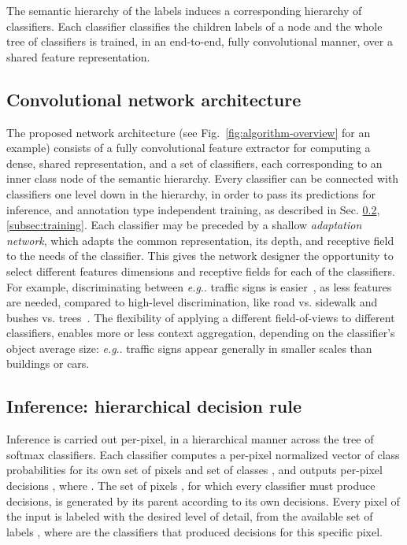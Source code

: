 \documentclass[letterpaper, 10 pt, conference]{ieeeconf}
\makeatletter
\DeclareRobustCommand\onedot{\futurelet\@let@token\@onedot}
\def\@onedot{\ifx\@let@token.\else.\null\fi\xspace}
\def\eg{\emph{e.g}\onedot}
\makeatother
\begin{document}
The semantic hierarchy of the labels induces a corresponding hierarchy of classifiers. Each classifier classifies the children labels of a node and the whole tree of classifiers is trained, in an end-to-end, fully convolutional manner, over a shared feature representation.

\subsection{Convolutional network architecture}
\label{subsec:conv-netw-arch}
The proposed network architecture (see Fig.~\ref{fig:algorithm-overview} for an example) consists of a fully convolutional feature extractor for computing a dense, shared representation, and a set of classifiers, each corresponding to an inner class node of the semantic hierarchy. Every classifier can be connected with classifiers one level down in the hierarchy, in order to pass its predictions for inference, and annotation type independent training, as described in Sec. \ref{subsec:inference}, \ref{subsec:training}. Each classifier may be preceded by a shallow \textit{adaptation network}, which adapts the common representation, its depth, and receptive field to the needs of the classifier. This gives the network designer the opportunity to select different features dimensions and receptive fields for each of the classifiers. For example, discriminating between \eg traffic signs is easier~\cite{ciregan2012multi}, as less features are needed, compared to high-level discrimination, like road vs. sidewalk and bushes vs. trees~\cite{c4}. The flexibility of applying a different field-of-views to different classifiers, enables more or less context aggregation, depending on the classifier's object average size: \eg traffic signs appear generally in smaller scales than buildings or cars.

\subsection{Inference: hierarchical decision rule}
\label{subsec:inference}
Inference is carried out per-pixel, in a hierarchical manner across the tree of softmax classifiers. Each classifier  computes a per-pixel normalized vector  of class probabilities for its own set of pixels  and set of classes , and outputs per-pixel decisions , where . The set of pixels , for which every classifier must produce decisions, is generated by its parent according to its own decisions. Every pixel of the input is labeled with the desired level of detail, from the available set of labels , where  are the classifiers that produced decisions for this specific pixel.
\end{document}
